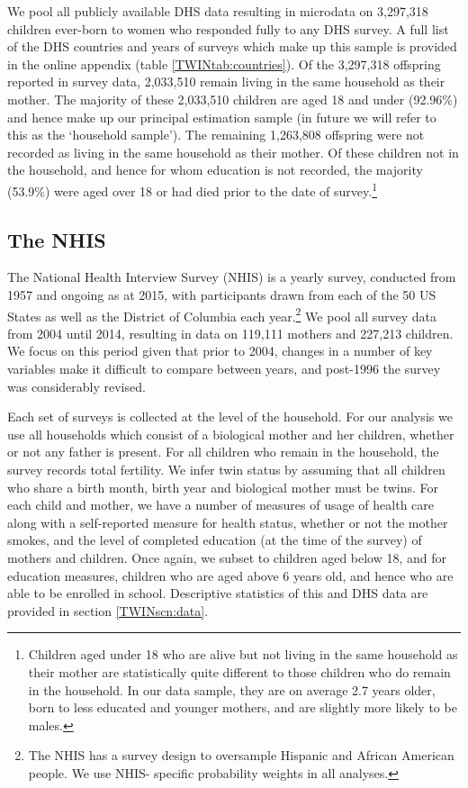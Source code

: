 \documentclass[a4paper, 11pt]{article}
\theoremstyle{plain}
\begin{document}
We pool all publicly available DHS data resulting in microdata on 3,297,318 
children ever-born to women who responded fully to any DHS survey. A full list of 
the DHS countries and years of surveys which make up this sample is provided in
the online appendix (table \ref{TWINtab:countries}).  Of the 3,297,318 offspring 
reported in survey data, 2,033,510 remain living in the same household as their 
mother.  The majority of these 2,033,510 children are aged 18 and under (92.96\%) 
and hence make up our principal estimation sample (in future we will refer to this 
as the `household sample'). The remaining 1,263,808 offspring were not recorded as 
living in the same household as their mother.  Of these children not in the 
household, and hence for whom education is not recorded, the majority (53.9\%) 
were aged over 18 or had died prior to the date of survey.\footnote{Children aged 
under 18 who are alive but not living in the same household as their mother are 
statistically quite different to those children who do remain in the household. 
In our data sample, they are on average 2.7 years older, born to less educated 
and younger mothers, and are slightly more likely to be males.}

\subsection{The NHIS}
The National Health Interview Survey (NHIS) is a yearly survey, conducted from 
1957 and ongoing as at 2015, with participants drawn from each of the 50 US 
States as well as the District of Columbia each year.\footnote{The NHIS has a
survey design to oversample Hispanic and African American people.  We use NHIS-%
specific probability weights in all analyses.}  We pool all survey data from 
2004 until 2014, resulting in data on 119,111 mothers and 227,213 children. We 
focus on this period given that prior to 2004, changes in a number of key 
variables make it difficult to compare between years, and post-1996 the survey 
was considerably revised.

Each set of surveys is collected at the level of the household.  For our 
analysis we use all households which consist of a biological mother and her 
children, whether or not any father is present.  For all children who remain in
the household, the survey records total fertility.  We infer twin status by
assuming that all children who share a birth month, birth year and biological
mother must be twins.  For each child and mother, we have a number of measures
of usage of health care along with a self-reported measure for health status, 
whether or not the mother smokes, and the level of completed education (at the 
time of the survey) of mothers and children.  Once again, we subset to children
aged below 18, and for education measures, children who are aged above 6 years
old, and hence who are able to be enrolled in school.  Descriptive statistics of
this and DHS data are provided in section \ref{TWINscn:data}.
\end{document}
